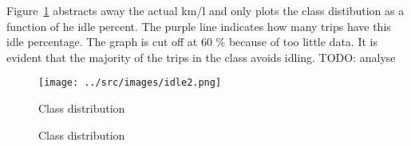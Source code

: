 Figure~\ref{fig:idleClassPercent} abstracts away the actual km/l and only plots the class distibution as a function of he idle percent. 
The purple line indicates how many trips have this idle percentage. 
The graph is cut off at 60 \% because of too little data.
It is evident that the majority of the trips in the \fuelHigh class avoids idling. 
TODO: analyse

\begin{figure}[htb]
\centering
\texttt{[image: ../src/images/idle2.png]}
\caption{Class distribution }
\label{fig:idleClassPercent}
\end{figure}

\begin{figure}[htb]
\centering
\caption{Class distribution}
\label{fig:idleClassTime}
\end{figure}

